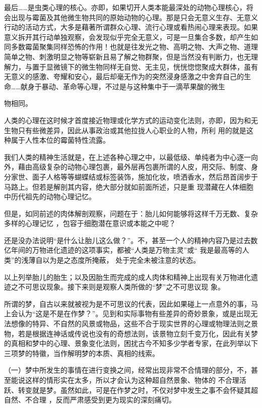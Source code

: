 \documentclass{article}
\begin{document}
最后……是虫类心理的核心。亦即，如果切开人类本能最深处的动物心理核心，将会出现与霉菌及其他微生物共同的原始动物的心理。那是只会无意义生存、无意义行动的活动方式，大多是藉著所谓群众心理、流行心理或看热闹心理来表现。如果意义拆开其行动单独观察，会发现似乎完全无意义，可是一旦集合多数，却产生如同多数霉菌聚集同样恐怖的作用！也就是往发光之物、高明之物、大声之物、道理简单之物、刺激明显之物等崭新且易了解之物群聚，但是当然没有判断力，也无理解力，与置于显微镜下的微生物同样无自觉、无主见，恍恍惚惚聚成大群体，虽有无意义的感激、夸耀和安心，最后却毫无作为的突然浸身感激之中舍弃自己的生命……献身于暴动、革命等心理，不过是与这种集中于一滴苹果酸的微生

\newpage
物相同。 

人类的心理在这时候才首度接近物理或化学方式的运动变化法则，亦即，因为和无生物只有些微差异，因此从事政治或其他拉拢人心职业的人物，所利
用的就是这种属于人性本位的霉菌特性流露。 

我们人类的精神生活就是，在上述各种心理之中，以最低级、单纯者为中心逐一向外，藉由高级复杂的动物心理包裹，最外层再包裹所谓的人皮，用交际、制度、身分家世、面子人格等等蝴蝶结或标签装饰，施加化妆，喷洒香水，然后昂首阔步于马路上。但若是解剖其内容，绝大部分就如前面所述，只是重
现潜藏在人体细胞中历代祖先的动物心理记忆。 

但是，如同前述的肉体解剖观察，问题在于：胎儿如何能够将这样千万无数、复杂多样的心理记忆
，包容于细胞潜在意识或本能之中呢？ 

还是没办法说明“是什么让胎儿这么做？”。不，甚至一个人的精神内容乃是过去数亿年间的万物进化遗迹的这项事实，都被“人类是万物主灵”或“
\newpage
我是最高等的人类”的浅薄自以为是之态度所掩蔽，
处于完全未被注意的状态。 

以上列举胎儿的胎生；以及因胎生而完成的成人肉体和精神上出现有关万物进化遗迹之不可思议现象。接下来则是观察人类所做的“梦”之不可思议现
象。 

所谓的梦，自古以来就被视为是不可思议的代表，因此如果碰上一点意外的事，马上会认为“这是不是在作梦？”。见到和实际事物有些差异的奇妙景象，或是出现无法想像的特异、不自然的风景或物品，这些不合于现实世界的心理或物理法则之景物，若是根据连神话或传说也没有的奇想法则，该景物立刻千变万化，因此有关梦的真相和梦中的心理、景象变化法则，困扰古今不知多少学者专家，在此列举以下
三项梦的特徽，当作解明梦的本质、真相的线索。 

（一）梦中所发生的事情在进行变换之间，经常出现非常不合情理的部分，不，甚至能说这样的情形实在太多，所以才会认为这种超自然景象、物体的
\newpage
不合理活跃、转变就是梦。虽然如此，可是在作梦之时，不仅对梦中发生之事不会怀疑其超自然、不合理
，反而严肃感受到更为现实的深刻痛切。 
\end{document}
